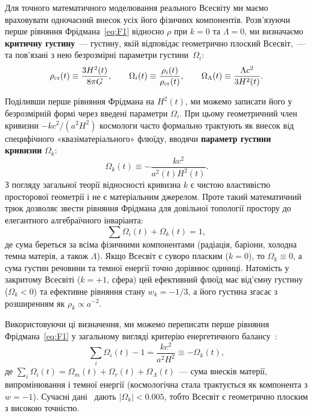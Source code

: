 Для точного математичного моделювання реального Всесвіту ми маємо враховувати одночасний внесок усіх його фізичних компонентів. Розв'язуючи перше рівняння Фрідмана~\eqref{eq:F1} відносно $\rho$ при $k = 0$ та $\Lambda = 0$, ми визначаємо \textbf{критичну густину}~--- густину, якій відповідає геометрично плоский Всесвіт,~--- та пов'язані з нею безрозмірні параметри густини~$\Omega_i$:
\begin{equation}\label{eq:rho_crit_new}
  \rho_\text{cr}(t) \equiv \frac{3H^2(t)}{8\pi G}, \qquad
  \Omega_i(t) \equiv \frac{\rho_i(t)}{\rho_{\rm cr}(t)}, \qquad
  \Omega_\Lambda(t) \equiv \frac{\Lambda c^2}{3H^2(t)}.
\end{equation}

Поділивши перше рівняння Фрідмана на $H^2(t)$, ми можемо записати його у безрозмірній формі через введені параметри $\Omega_i$. При цьому геометричний член кривизни $-kc^2/(a^2 H^2)$ космологи часто формально трактують як внесок від специфічного «квазіматеріального» флюїду, вводячи \textbf{параметр густини кривизни} $\Omega_k$:
\begin{equation}\label{eq:Omega_k_def}
  \Omega_k(t) \equiv -\frac{kc^2}{a^2(t)H^2(t)}.
\end{equation}
З погляду загальної теорії відносності кривизна $k$ є чистою властивістю просторової геометрії і не є матеріальним джерелом. Проте такий математичний трюк дозволяє звести рівняння Фрідмана для довільної топології простору до елегантного алгебраїчного інваріанта:
\begin{equation}\label{eq:omega_sum}
  \sum \Omega_i(t) + \Omega_k(t) = 1,
\end{equation}
де сума береться за всіма фізичними компонентами (радіація, баріони, холодна темна матерія, а також $\Lambda$). Якщо Всесвіт є суворо пласким ($k=0$), то $\Omega_k \equiv 0$, а сума густин речовини та темної енергії точно дорівнює одиниці. Натомість у закритому Всесвіті ($k = +1$, сфера) цей ефективний флюїд має від'ємну густину ($\Omega_k < 0$) та ефективне рівняння стану $w_k = -1/3$, а його густина згасає з розширенням як $\rho_k \propto a^{-2}$.

Використовуючи ці визначення, ми можемо переписати перше рівняння Фрідмана~\eqref{eq:F1} у загальному вигляді критерію енергетичного балансу~\cite{Weinberg2008,Baumann2022}:
\begin{equation}\label{eq:omega_sum_k_integrated}
  \sum_i \Omega_i(t) - 1 = \frac{kc^2}{a^2 H^2} \equiv -\Omega_k(t),
\end{equation}
де $\sum_i \Omega_i(t) = \Omega_m(t) + \Omega_r(t) + \Omega_\Lambda(t)$~---
сума внесків матерії, випромінювання і темної енергії
(космологічна стала трактується як компонента з $w=-1$).
Сучасні дані~\cite{planck_2018} дають $|\Omega_k| < 0.005$,
тобто Всесвіт є геометрично плоским з високою точністю.

